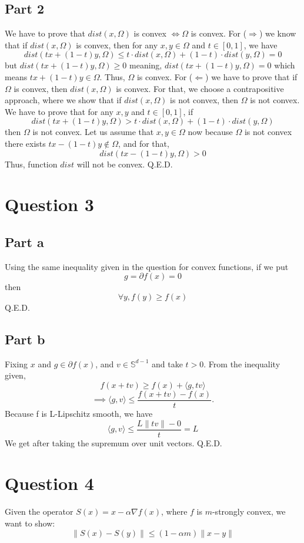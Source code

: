 \documentclass{article}
\begin{document}
\subsection*{Part 2}
We have to prove that $dist(x, \Omega)$ is convex $\iff \Omega$ is convex.\newline
For ($\Rightarrow$) we know that if $dist(x, \Omega)$ is convex, then for any $x, y \in \Omega$ and $t \in [0, 1]$, we have
\[dist(tx + (1-t)y, \Omega) \le t \cdot dist(x, \Omega) + (1-t) \cdot dist(y, \Omega) = 0\]
but $dist(tx + (1-t)y, \Omega) \ge 0$ meaning, $dist(tx + (1-t)y, \Omega) = 0$ which means $tx + (1-t)y \in \Omega$. Thus, $\Omega$ is convex.\newline
For ($\Leftarrow$) we have to prove that if $\Omega$ is convex, then $dist(x, \Omega)$ is convex. For that, we choose a contrapositive approach, where we show that if $dist(x, \Omega)$ is not convex, then $\Omega$ is not convex. We have to prove that for any $x, y$ and $t \in [0, 1]$, if    \[dist(tx + (1-t)y, \Omega) > t \cdot dist(x, \Omega) + (1-t) \cdot dist(y, \Omega)\]
then $\Omega$ is not convex. Let us assume that $x, y \in \Omega$ now because $\Omega$ is not convex there exists $tx - (1 - t)y \notin \Omega$, and for that, \[dist(tx - (1 - t)y, \Omega) > 0\]
Thus, function $dist$ will not be convex.
Q.E.D.
\section*{Question 3}
\subsection*{Part a}
Using the same inequality given in the question for convex functions, if we put \[g = \partial f(x) = 0\]  then 
\[\forall y, f(y) \ge f(x)\]
Q.E.D.
\subsection*{Part b}
Fixing $x$ and $g \in \partial f(x)$, and $v \in \mathbb{S}^{d - 1}$ and take $t > 0$. From the inequality given,
\[f(x + tv) \ge f(x) + \langle g, tv \rangle\]
\[\implies \langle g, v \rangle \le \frac{f(x + tv) - f(x)}{t}.\]
Because f is L-Lipschitz smooth, we have
\[\langle g, v \rangle \le \frac{L\|tv\| - 0}{t} = L\]
We get after taking the supremum over unit vectors. 
Q.E.D.
\section*{Question 4}
Given the operator \( S(x) = x - \alpha \nabla f(x) \), where \( f \) is \( m \)-strongly convex, we want to show:
\[
\|S(x) - S(y)\| \leq (1 - \alpha m) \|x - y\|
\]
\end{document}
